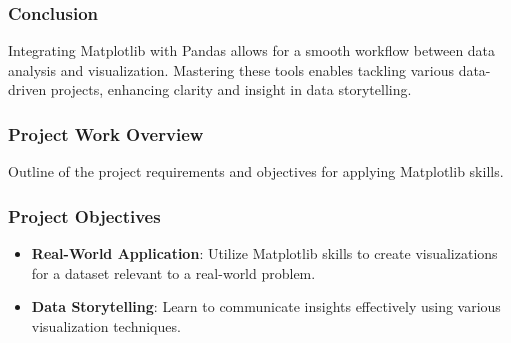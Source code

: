 \documentclass{beamer}
\begin{document}
\begin{frame}
    \frametitle{Conclusion}
    Integrating Matplotlib with Pandas allows for a smooth workflow between data analysis and visualization. 
    Mastering these tools enables tackling various data-driven projects, enhancing clarity and insight in data storytelling.
\end{frame}

\begin{frame}
    \frametitle{Project Work Overview}
    Outline of the project requirements and objectives for applying Matplotlib skills.
\end{frame}

\begin{frame}
    \frametitle{Project Objectives}
    \begin{itemize}
        \item \textbf{Real-World Application}: Utilize Matplotlib skills to create visualizations for a dataset relevant to a real-world problem.
        \item \textbf{Data Storytelling}: Learn to communicate insights effectively using various visualization techniques.
    \end{itemize}
\end{frame}
\end{document}
